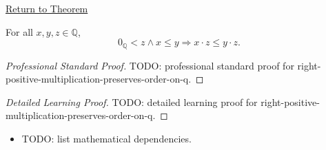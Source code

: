 \newpage
{}
\label{prf:right-positive-multiplication-preserves-order-on-q}

\begin{remark*}[Return]
\hyperref[cor:right-positive-multiplication-preserves-order-on-q]{Return to Theorem}
\end{remark*}

\begin{corollary*}
For all $x,y,z\in\mathbb{Q}$,
\[
0_{\mathbb{Q}}<z\land x\le y
\Longrightarrow
x\cdot z\le y\cdot z.
\]
\end{corollary*}

\begin{proof}[Professional Standard Proof]
\LRAProofBodyStart
TODO: professional standard proof for right-positive-multiplication-preserves-order-on-q.
\end{proof}

\begin{proof}[Detailed Learning Proof]
\LRAProofBodyStart
TODO: detailed learning proof for right-positive-multiplication-preserves-order-on-q.
\end{proof}

\begin{remark*}
\end{remark*}

\begin{dependencies}
\begin{itemize}
  \item TODO: list mathematical dependencies.
\end{itemize}
\end{dependencies}

\clearpage
